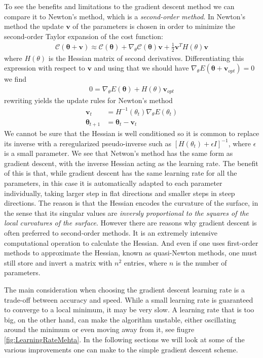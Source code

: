 \documentclass[twoside,english]{uiofysmaster}
\begin{document}
To see the benefits and limitations to the gradient descent method we can compare it to Newton's method, which is  a \textit{second-order method}. In Newton's method the update $\bm{v}$ of the parameters is chosen in order to minimize the second-order Taylor expansion of the cost function:
\begin{align}
	\mathcal{C}(\bm{\theta} + \mathbf{v}) \approx \mathcal{C}(\bm{\theta}) + \nabla_\theta \mathcal{C}(\bm{\theta})\mathbf{v} + \frac{1}{2} \mathbf{v}^T H(\theta) \mathbf{v}
\end{align}
where $H(\theta)$ is the Hessian matrix of second derivatives. Differentiating this expression with respect to $\bm{v}$ and using that we should have $\nabla_\theta E(\bm{\theta} + \mathbf{v}_{opt}) = 0$ we find
\begin{align}
	0 = \nabla_\theta E(\bm{\theta}) + H(\theta) \mathbf{v}_{opt}
\end{align}
rewriting yields the update rules for Newton's method
\begin{align}
	\mathbf{v}_t &= H^{-1} (\theta_t) \nabla_\theta E(\theta_t) \\
	\bm{\theta}_{t+1} &= \bm{\theta}_t - \mathbf{v}_t
\end{align}
We cannot be sure that the Hessian is well conditioned so it is common to replace its inverse with a reregularized pseudo-inverse such as $[H(\theta_t)+\epsilon I ]^{-1}$, where $\epsilon$ is a small parameter. We see that Netwon's method has the same form as gradient descent, with the inverse Hessian acting as the learning rate. The benefit of this is that, while gradient descent has the same learning rate for all the parameters, in this case it is automatically adapted to each parameter individually, taking larger step in flat directions and smaller steps in steep directions. The reason is that the Hessian encodes the curvature of the surface, in the sense that its singular values are \textit{inversly proportional to the squares of the local curvatures of the surface}. However there are reasons why gradient descent is often preferred to second-order methods. It is an extremely intensive computational operation to calculate the Hessian. And even if one uses first-order methods to approximate the Hessian, known as quasi-Newton methods, one must still store and invert a matrix with $n^2$ entries, where $n$ is the number of parameters. \cite{Mehta2018}

The main consideration when choosing the gradient descent learning rate is a trade-off between accuracy and speed. While a small learning rate is guaranteed to converge to a local minimum, it may be very slow. A learning rate that is too big, on the other hand, can make the algorithm unstable, either oscillating around the minimum or even moving away from it, see fiugre \ref{fig:LearningRateMehta}. In the following sections we will look at some of the various improvements one can make to the simple gradient descent scheme.
\end{document}
